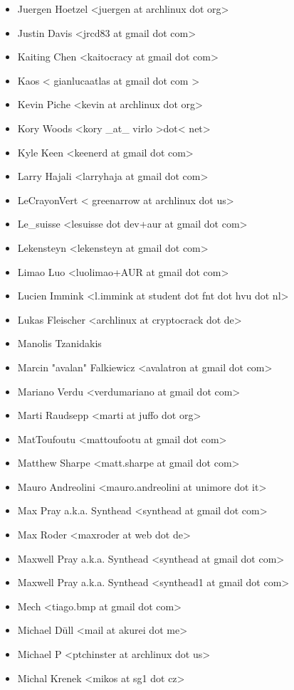 \begin{itemize}
\item  Juergen Hoetzel <juergen at archlinux dot org>
\item  Justin Davis <jrcd83 at gmail dot com>
\item  Kaiting Chen <kaitocracy at gmail dot com>
\item  Kaos < gianlucaatlas at gmail dot com >
\item  Kevin Piche <kevin at archlinux dot org>
\item  Kory Woods <kory \_at\_ virlo >dot< net>
\item  Kyle Keen <keenerd at gmail dot com>
\item  Larry Hajali <larryhaja at gmail dot com>
\item  LeCrayonVert < greenarrow at archlinux dot us>
\item  Le\_suisse <lesuisse dot dev+aur at gmail dot com>
\item  Lekensteyn <lekensteyn at gmail dot com>
\item  Limao Luo <luolimao+AUR at gmail dot com>
\item  Lucien Immink <l.immink at student dot fnt dot hvu dot nl>
\item  Lukas Fleischer <archlinux at cryptocrack dot de>
\item  Manolis Tzanidakis
\item  Marcin "avalan" Falkiewicz <avalatron at gmail dot com>
\item  Mariano Verdu <verdumariano at gmail dot com>
\item  Marti Raudsepp <marti at juffo dot org>
\item  MatToufoutu <mattoufootu at gmail dot com>
\item  Matthew Sharpe <matt.sharpe at gmail dot com>
\item  Mauro Andreolini <mauro.andreolini at unimore dot it>
\item  Max Pray a.k.a. Synthead <synthead at gmail dot com>
\item  Max Roder <maxroder at web dot de>
\item  Maxwell Pray a.k.a. Synthead <synthead at gmail dot com>
\item  Maxwell Pray a.k.a. Synthead <synthead1 at gmail dot com>
\item  Mech <tiago.bmp at gmail dot com>
\item  Michael Düll <mail at akurei dot me>
\item  Michael P <ptchinster at archlinux dot us>
\item  Michal Krenek <mikos at sg1 dot cz>

\end{itemize}
